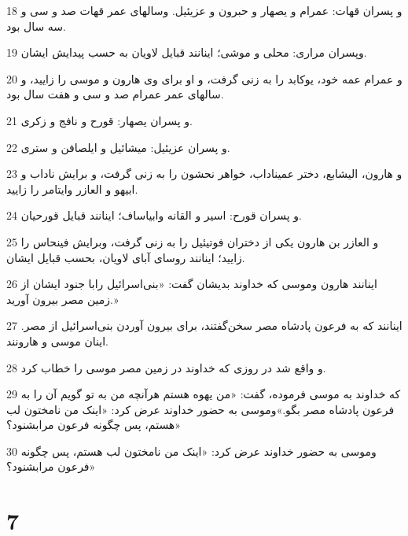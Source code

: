 \par 18 و پسران قهات: عمرام و یصهار و حبرون و عزیئیل. وسالهای عمر قهات صد و سی و سه سال بود.
\par 19 وپسران مراری: محلی و موشی؛ اینانند قبایل لاویان به حسب پیدایش ایشان.
\par 20 و عمرام عمه خود، یوکابد را به زنی گرفت، و او برای وی هارون و موسی را زایید، و سالهای عمر عمرام صد و سی و هفت سال بود.
\par 21 و پسران یصهار: قورح و نافج و زکری.
\par 22 و پسران عزیئیل: میشائیل و ایلصافن و ستری.
\par 23 و هارون، الیشابع، دختر عمیناداب، خواهر نحشون را به زنی گرفت، و برایش ناداب و ابیهو و العازر وایتامر را زایید.
\par 24 و پسران قورح: اسیر و القانه وابیاساف؛ اینانند قبایل قورحیان.
\par 25 و العازر بن هارون یکی از دختران فوتیئیل را به زنی گرفت، وبرایش فینحاس را زایید؛ اینانند روسای آبای لاویان، بحسب قبایل ایشان.
\par 26 اینانند هارون وموسی که خداوند بدیشان گفت: «بنی‌اسرائیل رابا جنود ایشان از زمین مصر بیرون آورید.»
\par 27 اینانند که به فرعون پادشاه مصر سخن‌گفتند، برای بیرون آوردن بنی‌اسرائیل از مصر. اینان موسی و هارونند.
\par 28 و واقع شد در روزی که خداوند در زمین مصر موسی را خطاب کرد.
\par 29 که خداوند به موسی فرموده، گفت: «من یهوه هستم هر‌آنچه من به تو گویم آن را به فرعون پادشاه مصر بگو.»وموسی به حضور خداوند عرض کرد: «اینک من نامختون لب هستم، پس چگونه فرعون مرابشنود؟»
\par 30 وموسی به حضور خداوند عرض کرد: «اینک من نامختون لب هستم، پس چگونه فرعون مرابشنود؟»
 
\chapter{7}

